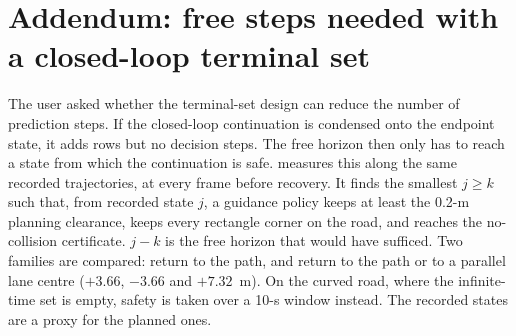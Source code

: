 \documentclass[11pt]{article}
\begin{document}
\section{Addendum: free steps needed with a closed-loop terminal set}
The user asked whether the terminal-set design can reduce the number of
prediction steps. If the closed-loop continuation is condensed onto the
endpoint state, it adds rows but no decision steps. The free horizon then only
has to reach a state from which the continuation is safe.
 measures this along the same
recorded trajectories, at every frame before recovery. It finds the smallest
$j\ge k$ such that, from recorded state $j$, a guidance policy keeps at least
the 0.2-m planning clearance, keeps every rectangle corner on the road, and
reaches the no-collision certificate. $j-k$ is the free horizon that would have
sufficed. Two families are compared: return to the path, and return to the
path or to a parallel lane centre ($+3.66$, $-3.66$ and $+7.32$~m). On the
curved road, where the infinite-time set is empty, safety is taken over a
10-s window instead. The recorded states are a proxy for the planned ones.
\end{document}
